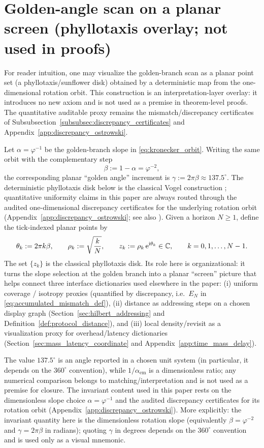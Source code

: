 \section*{Golden-angle scan on a planar screen (phyllotaxis overlay; not used in proofs)}
\label{subsec:phyllotaxis_overlay}
\InterfaceTag For reader intuition, one may visualize the golden-branch scan as a planar point set (a phyllotaxis/sunflower disk) obtained by a deterministic map from the one-dimensional rotation orbit.
\AuditTag This construction is an interpretation-layer overlay: it introduces no new axiom and is not used as a premise in theorem-level proofs.
The quantitative auditable proxy remains the mismatch/discrepancy certificates of Subsubsection~\ref{subsubsec:discrepancy_certificates} and Appendix~\ref{app:discrepancy_ostrowski}.

Let $\alpha=\varphi^{-1}$ be the golden-branch slope in \eqref{eq:kronecker_orbit}.
Writing the same orbit with the complementary step
\[
\beta := 1-\alpha = \varphi^{-2},
\]
the corresponding planar ``golden angle'' increment is $\gamma := 2\pi\beta \approx 137.5^\circ$.
\AuditTag The deterministic phyllotaxis disk below is the classical Vogel construction \cite{Vogel1979}; quantitative uniformity claims in this paper are always routed through the audited one-dimensional discrepancy certificates for the underlying rotation orbit (Appendix~\ref{app:discrepancy_ostrowski}; see also \cite{KuipersNiederreiter1974}).
Given a horizon $N\ge 1$, define the tick-indexed planar points by
\[
\theta_k := 2\pi k\beta,\qquad
\rho_k := \sqrt{\frac{k}{N}},\qquad
z_k := \rho_k\,\mathrm{e}^{\mathrm{i}\theta_k}\in\mathbb{C},\qquad k=0,1,\dots,N-1.
\]
The set $\{z_k\}$ is the classical phyllotaxis disk.
Its role here is organizational: it turns the slope selection at the golden branch into a planar ``screen'' picture that helps connect three interface dictionaries used elsewhere in the paper:
(i) uniform coverage / isotropy proxies (quantified by discrepancy, i.e.\ $E_N$ in \eqref{eq:accumulated_mismatch_def}),
(ii) distance as addressing steps on a chosen display graph (Section~\ref{sec:hilbert_addressing} and Definition~\ref{def:protocol_distance}),
and (iii) local density/revisit as a visualization proxy for overhead/latency dictionaries (Section~\ref{sec:mass_latency_coordinate} and Appendix~\ref{app:time_mass_delay}).

\MatchTag The value $137.5^\circ$ is an angle reported in a chosen unit system (in particular, it depends on the $360^\circ$ convention), while $1/\alpha_{\mathrm{em}}$ is a dimensionless ratio; any numerical comparison belongs to matching/interpretation and is not used as a premise for closure.
\MatchTag The invariant content used in this paper rests on the dimensionless slope choice $\alpha=\varphi^{-1}$ and the audited discrepancy certificates for its rotation orbit (Appendix~\ref{app:discrepancy_ostrowski}). More explicitly: the invariant quantity here is the dimensionless rotation slope (equivalently $\beta=\varphi^{-2}$ and $\gamma=2\pi\beta$ in radians); quoting $\gamma$ in degrees depends on the $360^\circ$ convention and is used only as a visual mnemonic.


